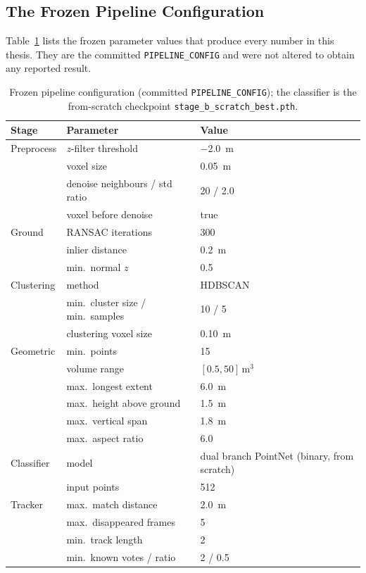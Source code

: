 \documentclass[a4paper,12pt]{report}
\begin{document}
\subsection{The Frozen Pipeline Configuration}
\label{sec:pipeline-config}

Table~\ref{tab:pipeline-config} lists the frozen parameter values that produce
every number in this thesis. They are the committed \texttt{PIPELINE\_CONFIG} and
were not altered to obtain any reported result.

\begin{table}[H]
  \centering
  \caption[Frozen pipeline configuration]{Frozen pipeline configuration (committed
    \texttt{PIPELINE\_CONFIG}); the classifier is the from-scratch checkpoint
    \texttt{stage\_b\_scratch\_best.pth}.}
  \label{tab:pipeline-config}
  \begin{tabular}{lll}
    \toprule
    Stage & Parameter & Value \\
    \midrule
    Preprocess & $z$-filter threshold & \SI{-2.0}{\meter} \\
               & voxel size & \SI{0.05}{\meter} \\
               & denoise neighbours / std ratio & \num{20} / \num{2.0} \\
               & voxel before denoise & true \\
    \midrule
    Ground     & RANSAC iterations & \num{300} \\
               & inlier distance & \SI{0.2}{\meter} \\
               & min.\ normal $z$ & \num{0.5} \\
    \midrule
    Clustering & method & HDBSCAN \\
               & min.\ cluster size / min.\ samples & \num{10} / \num{5} \\
               & clustering voxel size & \SI{0.10}{\meter} \\
    \midrule
    Geometric  & min.\ points & \num{15} \\
               & volume range & $[\num{0.5}, \num{50}]\,\si{\meter\cubed}$ \\
               & max.\ longest extent & \SI{6.0}{\meter} \\
               & max.\ height above ground & \SI{1.5}{\meter} \\
               & max.\ vertical span & \SI{1.8}{\meter} \\
               & max.\ aspect ratio & \num{6.0} \\
    \midrule
    Classifier & model & dual branch PointNet (binary, from scratch) \\
               & input points & \num{512} \\
    \midrule
    Tracker    & max.\ match distance & \SI{2.0}{\meter} \\
               & max.\ disappeared frames & \num{5} \\
               & min.\ track length & \num{2} \\
               & min.\ known votes / ratio & \num{2} / \num{0.5} \\
    \bottomrule
  \end{tabular}
\end{table}
\end{document}
